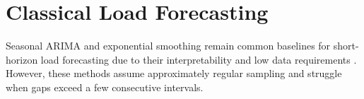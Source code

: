 \section{Classical Load Forecasting}
Seasonal ARIMA and exponential smoothing remain common baselines for short-horizon load
forecasting due to their interpretability and low data requirements \cite{box1976time}.
However, these methods assume approximately regular sampling and struggle when gaps exceed
a few consecutive intervals.
